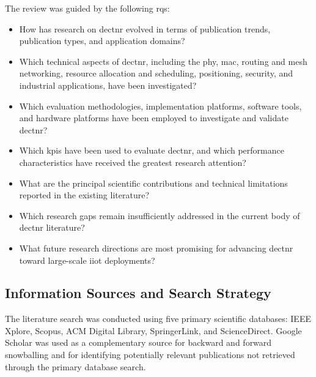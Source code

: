 The review was guided by the following \glspl{rq}:

\begin{itemize}

    \item[\textbf{RQ1}] How has research on \gls{dectnr} evolved in terms of
    publication trends, publication types, and application domains?

    \item[\textbf{RQ2}] Which technical aspects of \gls{dectnr}, including
    the \gls{phy}, \gls{mac}, routing and mesh networking, resource allocation
    and scheduling, positioning, security, and industrial applications, have
    been investigated?

    \item[\textbf{RQ3}] Which evaluation methodologies, implementation
    platforms, software tools, and hardware platforms have been employed to
    investigate and validate \gls{dectnr}?

    \item[\textbf{RQ4}] Which \glspl{kpi} have been used to evaluate
    \gls{dectnr}, and which performance characteristics have received the
    greatest research attention?

    \item[\textbf{RQ5}] What are the principal scientific contributions and
    technical limitations reported in the existing literature?

    \item[\textbf{RQ6}] Which research gaps remain insufficiently addressed
    in the current body of \gls{dectnr} literature?

    \item[\textbf{RQ7}] What future research directions are most promising
    for advancing \gls{dectnr} toward large-scale \gls{iiot} deployments?

\end{itemize}

\subsection{Information Sources and Search Strategy}
\label{subsec:search_strategy}

The literature search was conducted using five primary scientific databases:
IEEE Xplore, Scopus, ACM Digital Library, SpringerLink, and ScienceDirect.
Google Scholar was used as a complementary source for backward and forward
snowballing and for identifying potentially relevant publications not
retrieved through the primary database search.


